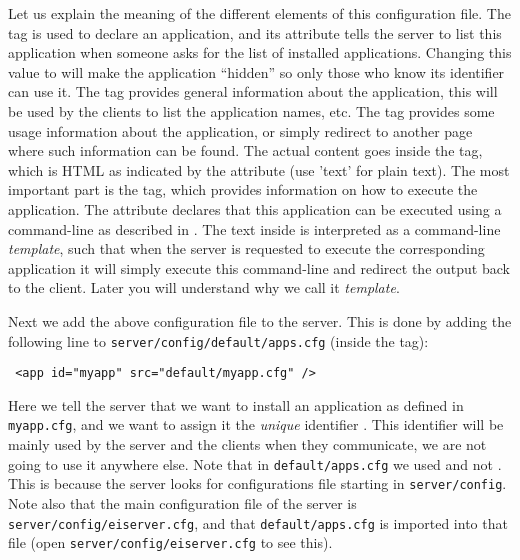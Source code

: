 \medskip
\noindent
Let us explain the meaning of the different elements of this
configuration file.
%
The  tag is used to declare an \ei application, and its
 attribute tells the server to list this application when
someone asks for the list of installed applications. Changing this
value to  will make the application ``hidden'' so only
those who know its identifier can use it.
%
The  tag provides general information about the
application, this will be used by the clients to list the application
names, etc.
%
The  tag provides some usage information about the
application, or simply redirect to another page where such information
can be found. The actual content goes inside the  tag,
which is HTML as indicated by the  attribute (use 'text'
for plain text).
%
The most important part is the  tag, which provides
information on how to execute the application. The attribute
 declares that this application can be executed using a
command-line as described in .
%
The text inside  is interpreted as a command-line
\emph{template}, such that when the server is requested to execute the
corresponding application it will simply execute this command-line and
redirect the output back to the client. Later you will understand why
we call it \emph{template}.

Next we add the above configuration file to the server. This is done
by adding the following line to \texttt{server/config/default/apps.cfg}
(inside the  tag):

\medskip
\begin{lstlisting}
 <app id="myapp" src="default/myapp.cfg" />
\end{lstlisting}

\medskip
\noindent
Here we tell the server that we want to install an application as
defined in \texttt{myapp.cfg}, and we want to assign it the
\emph{unique} identifier . This identifier will be mainly
used by the server and the clients when they communicate, we are not
going to use it anywhere else. 
%
Note that in \texttt{default/apps.cfg} we used
 and not . This is because
the server looks for configurations file starting in
\texttt{server/config}.
%
Note also that the main configuration file of the \ei server is
\texttt{server/config/eiserver.cfg}, and that
\texttt{default/apps.cfg} is imported into that file (open
\texttt{server/config/eiserver.cfg} to see this).

